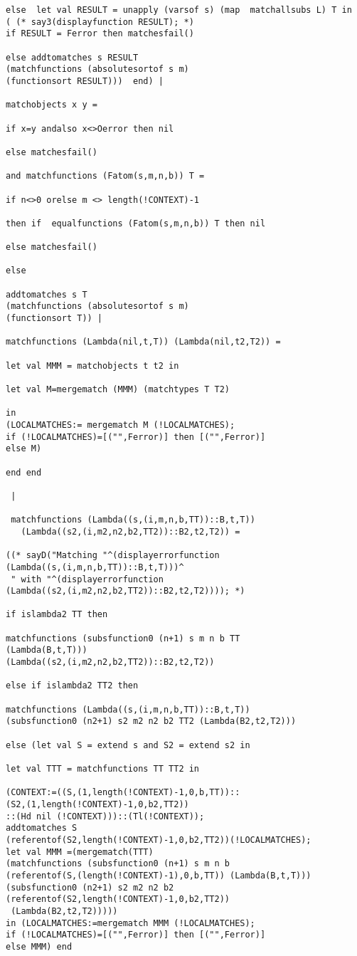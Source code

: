 \documentclass[12pt]{article}
\begin{document}
\begin{verbatim}
else  let val RESULT = unapply (varsof s) (map  matchallsubs L) T in
( (* say3(displayfunction RESULT); *)
if RESULT = Ferror then matchesfail()

else addtomatches s RESULT 
(matchfunctions (absolutesortof s m) 
(functionsort RESULT)))  end) |

matchobjects x y = 

if x=y andalso x<>Oerror then nil 

else matchesfail()

and matchfunctions (Fatom(s,m,n,b)) T =

if n<>0 orelse m <> length(!CONTEXT)-1

then if  equalfunctions (Fatom(s,m,n,b)) T then nil

else matchesfail()

else 

addtomatches s T 
(matchfunctions (absolutesortof s m) 
(functionsort T)) |

matchfunctions (Lambda(nil,t,T)) (Lambda(nil,t2,T2)) =

let val MMM = matchobjects t t2 in

let val M=mergematch (MMM) (matchtypes T T2)

in
(LOCALMATCHES:= mergematch M (!LOCALMATCHES);
if (!LOCALMATCHES)=[("",Ferror)] then [("",Ferror)]
else M)

end end

 |
 
 matchfunctions (Lambda((s,(i,m,n,b,TT))::B,t,T))
   (Lambda((s2,(i,m2,n2,b2,TT2))::B2,t2,T2)) =

((* sayD("Matching "^(displayerrorfunction 
(Lambda((s,(i,m,n,b,TT))::B,t,T)))^
 " with "^(displayerrorfunction 
(Lambda((s2,(i,m2,n2,b2,TT2))::B2,t2,T2)))); *)

if islambda2 TT then

matchfunctions (subsfunction0 (n+1) s m n b TT 
(Lambda(B,t,T)))
(Lambda((s2,(i,m2,n2,b2,TT2))::B2,t2,T2))

else if islambda2 TT2 then

matchfunctions (Lambda((s,(i,m,n,b,TT))::B,t,T)) 
(subsfunction0 (n2+1) s2 m2 n2 b2 TT2 (Lambda(B2,t2,T2)))

else (let val S = extend s and S2 = extend s2 in

let val TTT = matchfunctions TT TT2 in

(CONTEXT:=((S,(1,length(!CONTEXT)-1,0,b,TT))::
(S2,(1,length(!CONTEXT)-1,0,b2,TT2))
::(Hd nil (!CONTEXT)))::(Tl(!CONTEXT));
addtomatches S 
(referentof(S2,length(!CONTEXT)-1,0,b2,TT2))(!LOCALMATCHES);
let val MMM =(mergematch(TTT)
(matchfunctions (subsfunction0 (n+1) s m n b 
(referentof(S,(length(!CONTEXT)-1),0,b,TT)) (Lambda(B,t,T)))
(subsfunction0 (n2+1) s2 m2 n2 b2 
(referentof(S2,length(!CONTEXT)-1,0,b2,TT2))
 (Lambda(B2,t2,T2)))))
in (LOCALMATCHES:=mergematch MMM (!LOCALMATCHES);
if (!LOCALMATCHES)=[("",Ferror)] then [("",Ferror)]
else MMM) end 


\end{verbatim}
\end{document}
